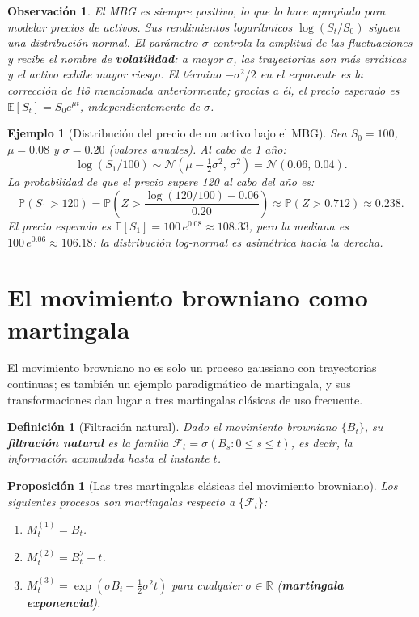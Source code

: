 \documentclass[12pt]{book}
\newtheorem{definition}{Definición}[chapter]
\newtheorem{proposition}{Proposición}[chapter]
\newtheorem{example}{Ejemplo}[chapter]
\newtheorem{remark}{Observación}[chapter]
\begin{document}
\begin{remark}
El MBG es siempre positivo, lo que lo hace apropiado para modelar precios de activos. Sus rendimientos logarítmicos $\log(S_t/S_0)$ siguen una distribución normal. El parámetro $\sigma$ controla la amplitud de las fluctuaciones y recibe el nombre de \textbf{volatilidad}: a mayor $\sigma$, las trayectorias son más erráticas y el activo exhibe mayor riesgo. El término $-\sigma^2/2$ en el exponente es la corrección de Itô mencionada anteriormente; gracias a él, el precio esperado es $\mathbb{E}[S_t] = S_0 e^{\mu t}$, independientemente de $\sigma$.
\end{remark}

\begin{example}[Distribución del precio de un activo bajo el MBG]
Sea $S_0 = 100$, $\mu = 0.08$ y $\sigma = 0.20$ (valores anuales). Al cabo de 1 año:
\[
    \log(S_1/100) \sim \mathcal{N}\!\left(\mu - \tfrac{1}{2}\sigma^2,\, \sigma^2\right) = \mathcal{N}(0.06,\, 0.04).
\]
La probabilidad de que el precio supere 120 al cabo del año es:
\[
    \mathbb{P}(S_1 > 120) = \mathbb{P}\!\left(Z > \frac{\log(120/100) - 0.06}{0.20}\right) \approx \mathbb{P}(Z > 0.712) \approx 0.238.
\]
El precio esperado es $\mathbb{E}[S_1] = 100\,e^{0.08} \approx 108.33$, pero la mediana es $100\,e^{0.06} \approx 106.18$: la distribución log-normal es asimétrica hacia la derecha.
\end{example}

\section{El movimiento browniano como martingala}

El movimiento browniano no es solo un proceso gaussiano con trayectorias continuas; es también un ejemplo paradigmático de martingala, y sus transformaciones dan lugar a tres martingalas clásicas de uso frecuente.

\begin{definition}[Filtración natural]
Dado el movimiento browniano $\{B_t\}$, su \textbf{filtración natural} es la familia $\mathcal{F}_t = \sigma(B_s : 0 \le s \le t)$, es decir, la información acumulada hasta el instante $t$.
\end{definition}

\begin{proposition}[Las tres martingalas clásicas del movimiento browniano]
\label{prop:tres_martingalas}
Los siguientes procesos son martingalas respecto a $\{\mathcal{F}_t\}$:
\begin{enumerate}
    \item[\normalfont(a)] $M_t^{(1)} = B_t$.
    \item[\normalfont(b)] $M_t^{(2)} = B_t^2 - t$.
    \item[\normalfont(c)] $M_t^{(3)} = \exp\!\left(\sigma B_t - \tfrac{1}{2}\sigma^2 t\right)$ para cualquier $\sigma \in \mathbb{R}$ (\textbf{martingala exponencial}).
\end{enumerate}
\end{proposition}
\end{document}
